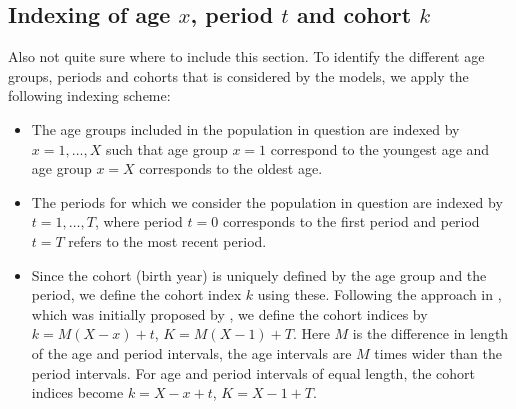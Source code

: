 \subsection{Indexing of age $x$, period $t$ and cohort $k$}
\textcolor{myDarkGreen}{Also not quite sure where to include this section. }
To identify the different age groups, periods and cohorts that is considered by the models, we apply the following indexing scheme:
\begin{itemize}
    \item The age groups included in the population in question are indexed by $x = 1,\ldots,X$ such that age group $x=1$ correspond to the youngest age and age group $x=X$ corresponds to the oldest age.
    \item The periods for which we consider the population in question are indexed by $t=1,\ldots,T$, where period $t=0$ corresponds to the first period and period $t = T$ refers to the most recent period. 
    \item Since the cohort (birth year) is uniquely defined by the age group and the period, we define the cohort index $k$ using these. Following the approach in \cite{rieblerHeld2010}, which was initially proposed by \cite{Heuer1997}, we define the cohort indices by $k = M(X - x) + t$, $K = M(X - 1) + T$. Here $M$ is the difference in length of the age and period intervals, the age intervals are $M$ times wider than the period intervals. For age and period intervals of equal length, the cohort indices become $k = X - x + t$, $K = X - 1 + T.$
\end{itemize}